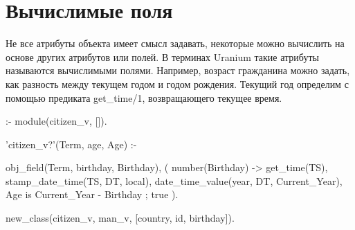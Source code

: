 \documentclass[a4paper]{book}
\def\ur{Uranium}
\begin{document}
\begin{comment}
В универсальном варианте предиката zagz используются
weak-варианты функций - они просто игнорируют те поля, которые
отсутствуют в объекте. Это позволяет использовать объекты в любых
сочетаниях, например:

\begin{example}{}{}
?- obj_construct(man_v, [sex, name, surname], 
      [man, 'Robert', 'Schumann'], A), 
   obj_construct(citizen_v, [sex, name, surname, country], 
      [woman, 'Oksana', 'Mazur', ['Ukraine']], B), 
   zagz(A, B, _, A2, B2), 
   obj_pretty_print(A2), 
   obj_pretty_print(B2).

man_v ( 
  sex : man 
  name : Robert 
  surname : Schumann 
) 
citizen_v ( 
  sex : woman 
  name : Oksana 
  surname : Schumann 
  country : [Ukraine] 
) 
\end{example}

то есть, как говорится, каждому своё. Оксане изменили фамилию, но
Роберту страну не добавили, поскольку мы не рассматривали Шумана
в гражданской плоскости.

Концепция написания универсальных предикатов может показаться
неожиданной тому, кто привык оперировать методами объекта. Но
причина в том, что в \ur{} объект - это прежде всего объект
наблюдения. А у объекта наблюдения нет методов, только
свойства. Получив какой-либо объект в виде, допустим, man_v, мы
не можем быть уверены, что за ним не скрывается citizen_v. И
поэтому в \ur{} существует такое понятие, как вычисление
класса и даункаст.

Но прежде, чем рассмотреть такую важную концепцию, как даункаст,
давайте исследуем мир вычислимых полей.
\end{comment}

\section{Вычислимые поля}

Не все атрибуты объекта имеет смысл задавать, некоторые можно
вычислить на основе других атрибутов или полей. В терминах
\ur{} такие атрибуты называются вычислимыми полями. Например,
возраст гражданина можно задать, как разность между текущем годом
и годом рождения. Текущий год определим с помощью предиката
get_time/1, возвращающего текущее время. 

\begin{example}{}{}
:- module(citizen_v, []).

'citizen_v?'(Term, age, Age) :-

        obj_field(Term, birthday, Birthday),
        (  number(Birthday)
        -> get_time(TS),
           stamp_date_time(TS, DT, local),
           date_time_value(year, DT, Current_Year),
           Age is Current_Year - Birthday
        ;
           true
        ).
        
new_class(citizen_v, man_v, [country, id, birthday]).
\end{example}
\end{document}
